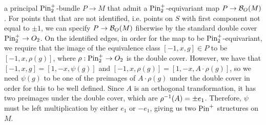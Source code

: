 \begin{exmp}
a principal $\mathrm{Pin}^+_2$-bundle $P \to M$ that admit a $\mathrm{Pin}_2^+$-equivariant
map $P \to \mathcal{B}_O(M)$. For points that that are not identified, i.e. points
on $S$ with first component not equal to $\pm 1$, we can specify
$P \to \mathcal{B}_O(M)$ fiberwise by the standard double cover $\mathrm{Pin}_2^+ \to O_2$. On
the identified edges, in order for the map to be $\mathrm{Pin}_2^+$-equivariant, we
require that the image of the equivalence class $[-1,x,g] \in P$ to be
$[-1, x, \rho(g)]$, where $\rho : \mathrm{Pin}_2^+ \to O_2$ is the double cover. However,
we have that $[-1,x,g] = [1, -x, \psi(g)]$ and
$[-1,x,\rho(g)] = [1,-x, A \cdot \rho(g)]$, so we need $\psi(g)$ to be one
of the preimages of $A \cdot \rho(g)$ under the double cover in order for this
to be well defined. Since $A$ is an orthogonal transformation, it has two
preimages under the double cover, which are $\rho^{-1}(A) = \pm e_1$. Therefore,
$\psi$ must be left multiplication by either $e_1$ or $-e_1$, giving us two
$\mathrm{Pin}^+$ structures on $M$. \\


\end{exmp}

